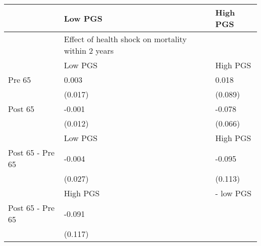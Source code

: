 % 
\begin{tabular}{lll}
  \hline
 & Low PGS & High PGS \\ 
  \hline
 & Effect of health shock on mortality within 2 years &  \\ 
   & Low PGS & High PGS \\ 
  Pre 65 & 0.003 & 0.018 \\ 
   & (0.017) & (0.089) \\ 
  Post 65 & -0.001 & -0.078 \\ 
   & (0.012) & (0.066) \\ 
   & Low PGS & High PGS \\ 
  Post 65 - Pre 65 & -0.004 & -0.095 \\ 
   & (0.027) & (0.113) \\ 
   & High PGS  & - low PGS \\ 
  Post 65 - Pre 65 & -0.091 &  \\ 
   & (0.117) &  \\ 
   \hline
\end{tabular}

